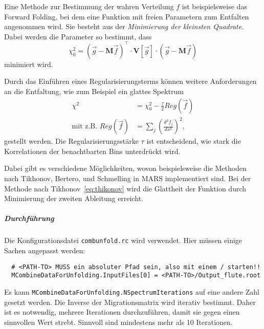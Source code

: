 Eine Methode zur Bestimmung der wahren Verteilung $f$ ist
beispielsweise das Forward Folding, 
bei dem eine Funktion mit freien Parametern zum Entfalten angenommen wird.
Sie
besteht aus der \textit{Minimierung der kleinsten Quadrate}.
Dabei werden die Parameter so bestimmt, dass
\begin{equation}
    \chi^2_0 = {\left( \vec{g} - \mathbf{M} \vec{f} \right)}^\intercal
        \cdot \mathbf{V} \left[ \vec{g} \right] \cdot
        \left( \vec{g} - \mathbf{M} \vec{f} \right)
\end{equation}
minimiert wird.

Durch das Einführen eines Regularisierungsterms können weitere Anforderungen an die
Entfaltung, wie zum Beispiel ein glattes Spektrum
\begin{align}
    \chi^2 &= \chi^2_0 - \frac{\tau}{2} Reg(\vec{f}) \\
    \text{mit z.B. } Reg(\vec{f}) &= \sum_j {\left( \frac{d^2 f_j}{dx^2}
    \right)}^2,
    \label{eq:thikonov}
\end{align}
gestellt werden.
Die Regularisierungsstärke $\tau$ ist entscheidend, wie stark die Korrelationen
der benachtbarten Bins unterdrückt wird. 

Dabei gibt es verschiedene Möglichkeiten,
wovon beispielsweise die Methoden nach
Tikhonov, Bertero, und Schmelling
in MARS implementiert sind.
Bei der Methode nach Tikhonov~\eqref{eq:thikonov} wird die Glattheit der
Funktion durch Minimierung der zweiten Ableitung erreicht.

\subparagraph{Durchführung}%

Die Konfigurationsdatei \texttt{combunfold.rc} wird verwendet.
Hier müssen einige Sachen angepasst werden:
\begin{lstlisting}
  # <PATH-TO> MUSS ein absoluter Pfad sein, also mit einem / starten!!
  MCombineDataForUnfolding.InputFiles[0] = <PATH-TO>/Output_flute.root
\end{lstlisting}
Es kann
\texttt{MCombineDataForUnfolding.NSpectrumIterations}
auf eine andere Zahl gesetzt werden.
Die Inverse der Migrationsmatrix wird iterativ bestimmt.
Daher ist es notwendig, mehrere
Iterationen durchzuführen, damit sie gegen einen sinnvollen Wert strebt.
Sinnvoll sind mindestens mehr als 10 Iterationen.

